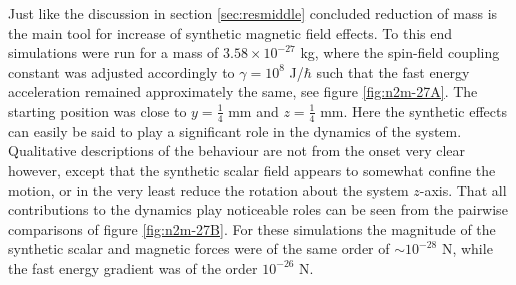\documentclass[main.tex]{subfiles}
\begin{document}
Just like the discussion in section \ref{sec:resmiddle} concluded reduction of mass is the
main tool for increase of synthetic magnetic field effects. To this end simulations were
run for a mass of \(3.58\times 10^{-27}\) kg, where the spin-field coupling constant was
adjusted accordingly to \(\gamma = 10^{8}\) J/\(\hbar{}\) such that the fast energy
acceleration remained approximately the same, see figure \ref{fig:n2m-27A}. The starting
position was close to \(y= \frac{1}{4}\) mm and \(z = \frac{1}{4}\) mm. Here the
synthetic effects can easily be said to play a significant role in the
dynamics of the system. Qualitative descriptions of the behaviour are not from the onset
very clear however, except that the synthetic scalar field appears to somewhat confine the
motion, or in the very least reduce the rotation about the system \(z\)-axis. That all
contributions to the dynamics play noticeable roles can be seen from the pairwise
comparisons of figure \ref{fig:n2m-27B}. For these simulations the magnitude of the
synthetic scalar and magnetic forces were of the same order of \(\sim 10^{-28}\) N, while
the fast energy gradient was of the order \(10^{-26}\) N.
\end{document}
